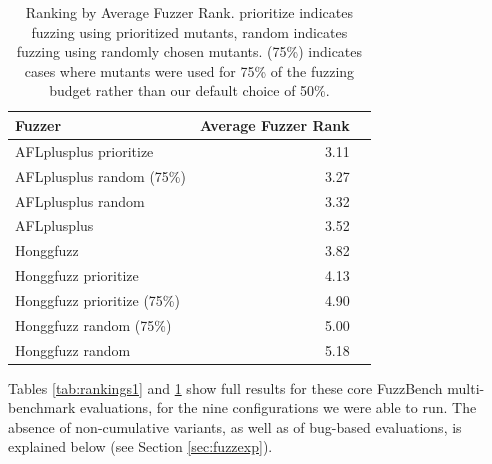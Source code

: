     \begin{table}
      \begin{tabular}{l|r|r}
        Fuzzer & Average Fuzzer Rank \\
        \hline
        \hline
AFLplusplus prioritize & 3.11 \\
AFLplusplus random (75\%) & 3.27 \\
AFLplusplus random & 3.32 \\
AFLplusplus & 3.52 \\
Honggfuzz & 3.82 \\
Honggfuzz prioritize & 4.13 \\
Honggfuzz prioritize (75\%) & 4.90 \\
Honggfuzz random (75\%) & 5.00 \\
Honggfuzz random & 5.18 \\
      \end{tabular}
      \caption{Ranking by Average Fuzzer Rank.  prioritize indicates fuzzing using prioritized mutants, random indicates fuzzing using randomly chosen mutants.  (75\%) indicates cases where mutants were used for 75\% of the fuzzing budget rather than our default choice of 50\%.}
      \label{tab:rankings2}
    \end{table}
    
Tables \ref{tab:rankings1} and \ref{tab:rankings2} show full results for these core FuzzBench multi-benchmark evaluations, for the nine configurations we were able to run.  The absence of non-cumulative variants, as well as of bug-based evaluations, is explained below (see Section \ref{sec:fuzzexp}).



